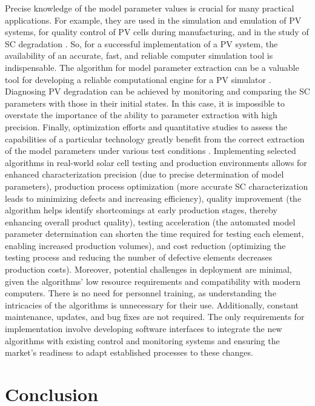 \documentclass[a4paper,fleqn]{cas-sc}
\begin{document}
Precise knowledge of the model parameter values is crucial for many practical applications.
For example, they are used in the simulation and emulation of PV systems,
for quality control of PV cells during manufacturing,
and in the study of SC degradation \cite{Chin2019}.
So, for a successful implementation of a PV system, the availability of an accurate,
fast, and reliable computer simulation tool is indispensable.
The algorithm for model parameter extraction can be a valuable tool for developing a
reliable computational engine for a PV simulator \cite{Chin2017}.
Diagnosing PV degradation can be achieved by monitoring and comparing the SC parameters with those in their initial states.
In this case, it is impossible to overstate the importance of the ability to parameter extraction with high precision.
Finally, optimization efforts and quantitative studies to assess the capabilities of a particular technology greatly benefit from the correct extraction of the model parameters under various test conditions \cite{OrtizConde2006}.
Implementing selected algorithms in real-world solar cell testing and production environments allows for
enhanced characterization precision (due to precise determination of model parameters),
production process optimization (more accurate SC characterization leads to minimizing defects and increasing efficiency),
quality improvement (the algorithm helps identify shortcomings at early production stages,
thereby enhancing overall product quality),
testing acceleration (the automated model parameter determination can shorten the time
required for testing each element, enabling increased production volumes),
and cost reduction (optimizing the testing process and reducing the number of defective elements decreases production costs).
Moreover, potential challenges in deployment are minimal, given the algorithms'
low resource requirements and compatibility with modern computers.
There is no need for personnel training, as understanding the intricacies of the algorithms is unnecessary for their use.
Additionally, constant maintenance, updates, and bug fixes are not required.
The only requirements for implementation involve developing software interfaces to integrate the new algorithms with existing control and monitoring systems and ensuring the market's readiness to adapt established processes to these changes.



\section{Conclusion}\label{SecConsl}
\end{document}
